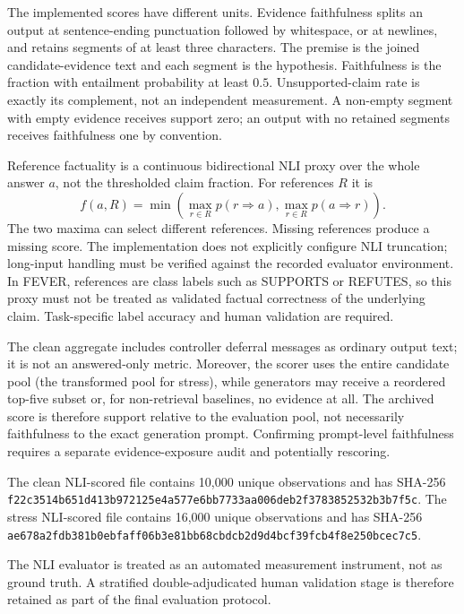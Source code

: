 \documentclass[manuscript, screen, review]{jair}
\begin{document}
The implemented scores have different units. Evidence faithfulness splits an
output at sentence-ending punctuation followed by whitespace, or at newlines,
and retains segments of at least three characters. The premise is the joined
candidate-evidence text and each segment is the hypothesis. Faithfulness is the
fraction with entailment probability at least $0.5$. Unsupported-claim rate is
exactly its complement, not an independent measurement. A non-empty segment
with empty evidence receives support zero; an output with no retained segments
receives faithfulness one by convention.

Reference factuality is a continuous bidirectional NLI proxy over the whole
answer $a$, not the thresholded claim fraction. For references $R$ it is
\begin{equation}
f(a,R)=\min\left(\max_{r\in R}p(r\Rightarrow a),
\max_{r\in R}p(a\Rightarrow r)\right).
\end{equation}
The two maxima can select different references. Missing references produce a
missing score. The implementation does not explicitly configure NLI truncation;
long-input handling must be verified against the recorded evaluator environment.
In FEVER, references are class labels such as SUPPORTS or REFUTES, so this proxy
must not be treated as validated factual correctness of the underlying claim.
Task-specific label accuracy and human validation are required.

The clean aggregate includes controller deferral messages as ordinary output
text; it is not an answered-only metric. Moreover, the scorer uses the entire
candidate pool (the transformed pool for stress), while generators may receive
a reordered top-five subset or, for non-retrieval baselines, no evidence at all.
The archived score is therefore support relative to the evaluation pool, not
necessarily faithfulness to the exact generation prompt. Confirming prompt-level
faithfulness requires a separate evidence-exposure audit and potentially rescoring.

The clean NLI-scored file contains 10,000 unique observations and has SHA-256
\nolinkurl{f22c3514b651d413b972125e4a577e6bb7733aa006deb2f3783852532b3b7f5c}.
The stress NLI-scored file contains 16,000 unique observations and has SHA-256
\nolinkurl{ae678a2fdb381b0ebfaff06b3e81bb68cbdcb2d9d4bcf39fcb4f8e250bcec7c5}.

The NLI evaluator is treated as an automated measurement instrument, not as
ground truth. A stratified double-adjudicated human validation stage is
therefore retained as part of the final evaluation protocol.
\end{document}
